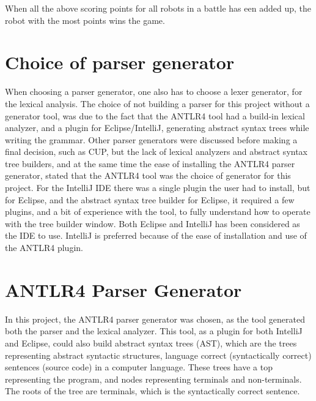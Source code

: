 When all the above scoring points for all robots in a battle has een added up, the robot with the most points wins the game.


\section{Choice of parser generator}
\label{sec:ParserGenerator}
When choosing a parser generator, one also has to choose a lexer generator, for the lexical analysis. The choice of not building a parser for this project without a generator tool, was due to the fact that the ANTLR4 tool had a build-in lexical analyzer, and a plugin for Eclipse/IntelliJ, generating abstract syntax trees while writing the grammar. Other parser generators were discussed before making a final decision, such as CUP, but the lack of lexical analyzers and abstract syntax tree builders, and at the same time the ease of installing the ANTLR4 parser generator, stated that the ANTLR4 tool was the choice of generator for this project. For the IntelliJ IDE there was a single plugin the user had to install, but for Eclipse, and the abstract syntax tree builder for Eclipse, it required a few plugins, and a bit of experience with the tool, to fully understand how to operate with the tree builder window. Both Eclipse and IntelliJ has been considered as the IDE to use. IntelliJ is preferred because of the ease of installation and use of the ANTLR4 plugin.
 
\section{ANTLR4 Parser Generator}
\label{Antlr}
In this project, the ANTLR4 parser generator was chosen, as the tool generated both the parser and the lexical analyzer. This tool, as a plugin for both IntelliJ and Eclipse, could also build abstract syntax trees (AST), which are the trees representing abstract syntactic structures, language correct (syntactically correct) sentences (source code) in a computer language. These trees have a top representing the program, and nodes representing terminals and non-terminals. The roots of the tree are terminals, which is the syntactically correct sentence.

